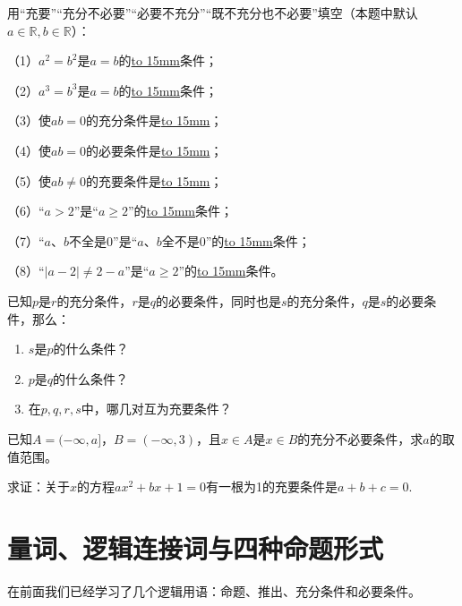 \documentclass[lang=cn,math=cm,chinesefont=nofont,11pt,scheme=chinese,onecol]{elegantbook}
\begin{document}
\begin{exercise}\label{BJ4Z_Algebra1_P28.2}
  用“充要”“充分不必要”“必要不充分”“既不充分也不必要”填空（本题中默认$a\in\mathbb{R},b\in\mathbb{R}$）：

  （1）$a^2=b^2$是$a=b$的\underline{\hbox to 15mm{}}条件；

  （2）$a^3=b^3$是$a=b$的\underline{\hbox to 15mm{}}条件；

  （3）使$ab=0$的充分条件是\underline{\hbox to 15mm{}}；

  （4）使$ab=0$的必要条件是\underline{\hbox to 15mm{}}；

  （5）使$ab\neq 0$的充要条件是\underline{\hbox to 15mm{}}；

  （6）“$a>2$”是“$a\geqslant2$”的\underline{\hbox to 15mm{}}条件；

  （7）“$a、b$不全是0”是“$a、b$全不是0”的\underline{\hbox to 15mm{}}条件；

  （8）“$\vert a-2\vert\neq2-a$”是“$a\geqslant2$”的\underline{\hbox to 15mm{}}条件。
\end{exercise}

\begin{exercise}\label{2017_XJ_bx1_P23.8}
  已知$p$是$r$的充分条件，$r$是$q$的必要条件，同时也是$s$的充分条件，$q$是$s$的必要条件，那么：
\end{exercise}

\begin{enumerate}
  \item $s$是$p$的什么条件？
  \item $p$是$q$的什么条件？
  \item 在$p,q,r,s$中，哪几对互为充要条件？
\end{enumerate}

\begin{exercise}\label{2017_RJB_bx1_P36.B5}
  已知$A=(-\infty,a]$，$B=(-\infty,3)$，且$x\in A$是$x\in B$的充分不必要条件，求$a$的取值范围。
\end{exercise}

\begin{exercise}\label{zhw2000_g1_P51.78}
  求证：关于$x$的方程$ax^2+bx+1=0$有一根为1的充要条件是$a+b+c=0$.
\end{exercise}

\section{量词、逻辑连接词与四种命题形式}

在前面我们已经学习了几个逻辑用语：命题、推出、充分条件和必要条件。
\end{document}
